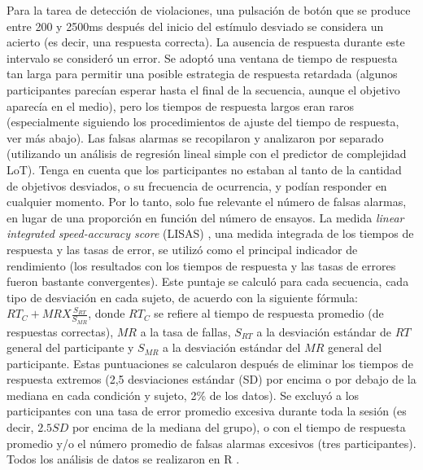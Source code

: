 Para la tarea de detección de violaciones, una pulsación de botón que se produce entre 200 y 2500ms después del inicio del estímulo desviado se considera un acierto (es decir, una respuesta correcta). La ausencia de respuesta durante este intervalo se consideró un error. Se adoptó una ventana de tiempo de respuesta tan larga para permitir una posible estrategia de respuesta retardada (algunos participantes parecían esperar hasta el final de la secuencia, aunque el objetivo aparecía en el medio), pero los tiempos de respuesta largos eran raros (especialmente siguiendo los procedimientos de ajuste del tiempo de respuesta, ver más abajo). Las falsas alarmas se recopilaron y analizaron por separado (utilizando un análisis de regresión lineal simple con el predictor de complejidad LoT). Tenga en cuenta que los participantes no estaban al tanto de la cantidad de objetivos desviados, o su frecuencia de ocurrencia, y podían responder en cualquier momento. Por lo tanto, solo fue relevante el número de falsas alarmas, en lugar de una proporción en función del número de ensayos. La medida \textit{linear integrated speed-accuracy score} (LISAS) \cite{f87,f88}, una medida integrada de los tiempos de respuesta y las tasas de error, se utilizó como el principal indicador de rendimiento (los resultados con los tiempos de respuesta y las tasas de errores fueron bastante convergentes). Este puntaje se calculó para cada secuencia, cada tipo de desviación en cada sujeto, de acuerdo con la siguiente fórmula: $RT_C + MR X \frac{S_{RT}}{S_{MR}}$, donde $RT_C$ se refiere al tiempo de respuesta promedio (de respuestas correctas), $MR$ a la tasa de fallas, $S_{RT}$ a la desviación estándar de $RT$ general del participante y $S_{MR}$ a la desviación estándar del $MR$ general del participante. Estas puntuaciones se calcularon después de eliminar los tiempos de respuesta extremos (2,5 desviaciones estándar (SD) por encima o por debajo de la mediana en cada condición y sujeto, 2\% de los datos). Se excluyó a los participantes con una tasa de error promedio excesiva durante toda la sesión (es decir, $2.5 SD$ por encima de la mediana del grupo), o con el tiempo de respuesta promedio y/o el número promedio de falsas alarmas excesivos (tres participantes). Todos los análisis de datos se realizaron en R \cite{f136}.


